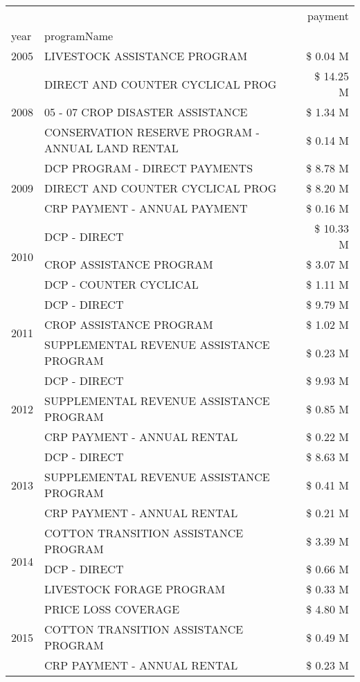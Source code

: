 \begin{tabular}{llr}
\toprule
 &  & payment \\
year & programName &  \\
\midrule
2005 & LIVESTOCK ASSISTANCE PROGRAM & \$ 0.04 M \\
\cline{1-3}
\multirow[t]{3}{*}{2008} & DIRECT AND COUNTER CYCLICAL PROG & \$ 14.25 M \\
 & 05 - 07 CROP DISASTER ASSISTANCE & \$ 1.34 M \\
 & CONSERVATION RESERVE PROGRAM - ANNUAL LAND RENTAL & \$ 0.14 M \\
\cline{1-3}
\multirow[t]{3}{*}{2009} & DCP PROGRAM - DIRECT PAYMENTS & \$ 8.78 M \\
 & DIRECT AND COUNTER CYCLICAL PROG & \$ 8.20 M \\
 & CRP PAYMENT - ANNUAL PAYMENT & \$ 0.16 M \\
\cline{1-3}
\multirow[t]{3}{*}{2010} & DCP - DIRECT & \$ 10.33 M \\
 & CROP ASSISTANCE PROGRAM & \$ 3.07 M \\
 & DCP - COUNTER CYCLICAL & \$ 1.11 M \\
\cline{1-3}
\multirow[t]{3}{*}{2011} & DCP - DIRECT & \$ 9.79 M \\
 & CROP ASSISTANCE PROGRAM & \$ 1.02 M \\
 & SUPPLEMENTAL REVENUE ASSISTANCE PROGRAM & \$ 0.23 M \\
\cline{1-3}
\multirow[t]{3}{*}{2012} & DCP - DIRECT & \$ 9.93 M \\
 & SUPPLEMENTAL REVENUE ASSISTANCE PROGRAM & \$ 0.85 M \\
 & CRP PAYMENT - ANNUAL RENTAL & \$ 0.22 M \\
\cline{1-3}
\multirow[t]{3}{*}{2013} & DCP - DIRECT & \$ 8.63 M \\
 & SUPPLEMENTAL REVENUE ASSISTANCE PROGRAM & \$ 0.41 M \\
 & CRP PAYMENT - ANNUAL RENTAL & \$ 0.21 M \\
\cline{1-3}
\multirow[t]{3}{*}{2014} & COTTON TRANSITION ASSISTANCE PROGRAM & \$ 3.39 M \\
 & DCP - DIRECT & \$ 0.66 M \\
 & LIVESTOCK FORAGE PROGRAM & \$ 0.33 M \\
\cline{1-3}
\multirow[t]{3}{*}{2015} & PRICE LOSS COVERAGE & \$ 4.80 M \\
 & COTTON TRANSITION ASSISTANCE PROGRAM & \$ 0.49 M \\
 & CRP PAYMENT - ANNUAL RENTAL & \$ 0.23 M \\

\end{tabular}
